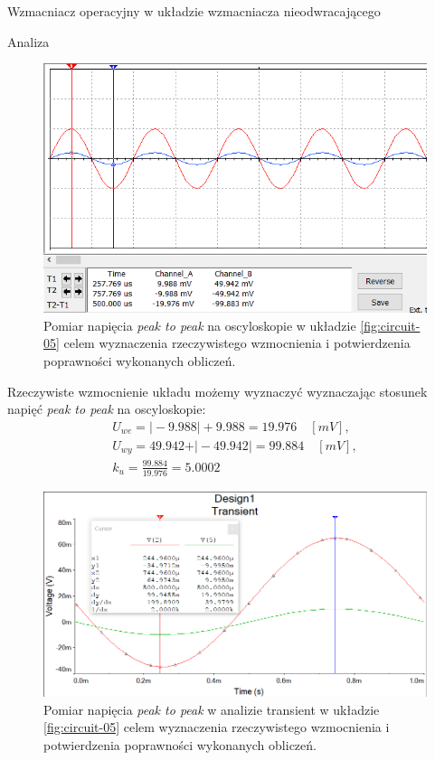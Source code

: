 \documentclass[a4paper]{scrartcl}
\begin{document}
\begin{section}{Wzmacniacz operacyjny w układzie wzmacniacza nieodwracającego}
\begin{subsection}{Analiza}
				\begin{figure}[ht]
				\begin{center}
					\includegraphics[width=0.7\linewidth]{05-osc}
					\caption{Pomiar napięcia \textit{peak to peak} na oscyloskopie w układzie \ref{fig:circuit-05} celem wyznaczenia rzeczywistego wzmocnienia i potwierdzenia poprawności wykonanych obliczeń.}
				\end{center}
				\end{figure}
				\pagebreak

				Rzeczywiste wzmocnienie układu możemy wyznaczyć wyznaczając stosunek napięć \textit{peak to peak} na oscyloskopie:
				\begin{gather*}
					U_{we} = \vert-9.988\vert + 9.988 = 19.976\quad [mV], \\ 
					U_{wy} = 49.942 + \vert-49.942\vert = 99.884 \quad [mV],\\
					k_{u} = \frac{99.884}{19.976} = 5.0002
				\end{gather*}

				\begin{figure}[!ht]
				\begin{center}
					\includegraphics[width=0.7\linewidth,scale=2]{05-transient}
					\caption{Pomiar napięcia \textit{peak to peak} w analizie transient w układzie \ref{fig:circuit-05} celem wyznaczenia rzeczywistego wzmocnienia i potwierdzenia poprawności wykonanych obliczeń.}
				\end{center}
				\end{figure}


\end{subsection}
\end{section}
\end{document}
